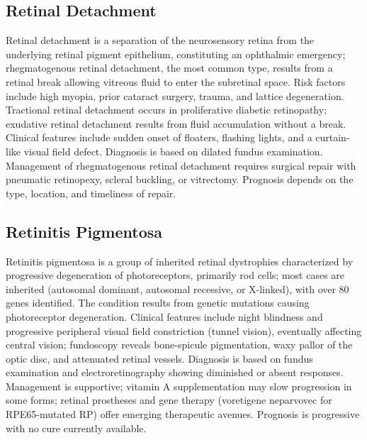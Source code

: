 \subsection{Retinal Detachment}
\label{sec:Retinal Detachment}
Retinal detachment is a separation of the neurosensory retina from the underlying retinal pigment epithelium, constituting an ophthalmic emergency; rhegmatogenous retinal detachment, the most common type, results from a retinal break allowing vitreous fluid to enter the subretinal space. Risk factors include high myopia, prior cataract surgery, trauma, and lattice degeneration. Tractional retinal detachment occurs in proliferative diabetic retinopathy; exudative retinal detachment results from fluid accumulation without a break. Clinical features include sudden onset of floaters, flashing lights, and a curtain-like visual field defect. Diagnosis is based on dilated fundus examination. Management of rhegmatogenous retinal detachment requires surgical repair with pneumatic retinopexy, scleral buckling, or vitrectomy. Prognosis depends on the type, location, and timeliness of repair.

\subsection{Retinitis Pigmentosa}
\label{sec:Retinitis Pigmentosa}
Retinitis pigmentosa is a group of inherited retinal dystrophies characterized by progressive degeneration of photoreceptors, primarily rod cells; most cases are inherited (autosomal dominant, autosomal recessive, or X-linked), with over 80 genes identified. The condition results from genetic mutations causing photoreceptor degeneration. Clinical features include night blindness and progressive peripheral visual field constriction (tunnel vision), eventually affecting central vision; fundoscopy reveals bone-spicule pigmentation, waxy pallor of the optic disc, and attenuated retinal vessels. Diagnosis is based on fundus examination and electroretinography showing diminished or absent responses. Management is supportive; vitamin A supplementation may slow progression in some forms; retinal prostheses and gene therapy (voretigene neparvovec for RPE65-mutated RP) offer emerging therapeutic avenues. Prognosis is progressive with no cure currently available.

